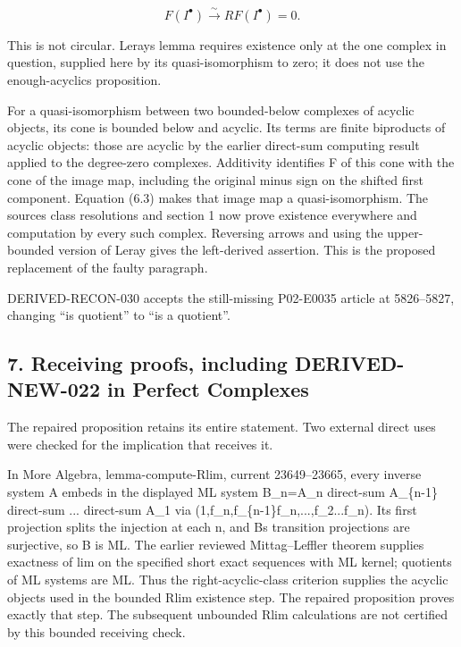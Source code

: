 \documentclass[11pt]{article}
\begin{document}
\[
 F(I^\bullet)\xrightarrow{\sim}RF(I^\bullet)=0.             \tag{6.3}
\]

This is not circular. Leray\textquotesingle s lemma requires existence only at the one complex in question,\allowbreak{} supplied here by its quasi-isomorphism to zero; it does not use the enough-acyclics proposition.

For a quasi-isomorphism between two bounded-below complexes of acyclic objects,\allowbreak{} its cone is bounded below and acyclic. Its terms are finite biproducts of acyclic objects:\allowbreak{} those are acyclic by the earlier direct-sum computing result applied to the degree-zero complexes. Additivity identifies F of this cone with the cone of the image map,\allowbreak{} including the original minus sign on the shifted first component. Equation (6.3)\allowbreak{} makes that image map a quasi-isomorphism. The source\textquotesingle s class resolutions and section 1 now prove existence everywhere and computation by every such complex. Reversing arrows and using the upper-bounded version of Leray gives the left-derived assertion. This is the proposed replacement of the faulty paragraph.

DERIVED-RECON-030 accepts the still-missing P02-E0035 article at 5826–\allowbreak{}5827,\allowbreak{} changing ``is quotient'' to ``is a quotient''.

\subsection{\texorpdfstring{7. Receiving proofs,\allowbreak{} including DERIVED-NEW-022 in Perfect Complexes}{7. Receiving  including DERIVED-NEW-022 in Perfect Complexes}}\label{proofs-5091-5900-receiving-proofs-including-derived-new-022-in-perfect-complexes}

The repaired proposition retains its entire statement. Two external direct uses were checked for the implication that receives it.

In More Algebra,\allowbreak{} lemma-compute-Rlim,\allowbreak{} current 23649–\allowbreak{}23665,\allowbreak{} every inverse system A embeds in the displayed ML system B\_\allowbreak{}n\allowbreak{}=A\_\allowbreak{}n direct-sum A\_\allowbreak{}\{n-1\} direct-sum ... direct-sum A\_\allowbreak{}1 via (1,\allowbreak{}f\_\allowbreak{}n,\allowbreak{}f\_\allowbreak{}\{n-1\}f\_\allowbreak{}n,\allowbreak{}...,\allowbreak{}f\_\allowbreak{}2...f\_\allowbreak{}n)\allowbreak{}. Its first projection splits the injection at each n,\allowbreak{} and B\textquotesingle s transition projections are surjective,\allowbreak{} so B is ML. The earlier reviewed Mittag–\allowbreak{}Leffler theorem supplies exactness of lim on the specified short exact sequences with ML kernel; quotients of ML systems are ML. Thus the right-acyclic-class criterion supplies the acyclic objects used in the bounded Rlim existence step. The repaired proposition proves exactly that step. The subsequent unbounded Rlim calculations are not certified by this bounded receiving check.
\end{document}
